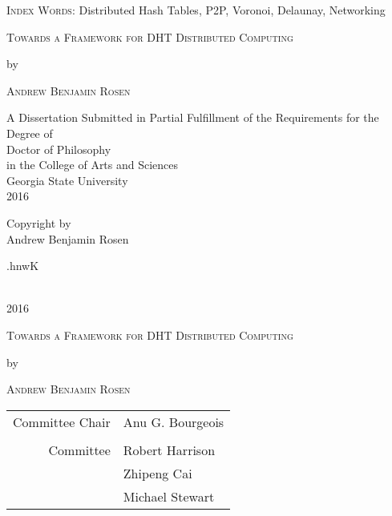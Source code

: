 \documentclass[11pt,letterpaper]{report}
\begin{document}
		\vfill
		

		{\textsc{Index Words}: Distributed Hash Tables, P2P, Voronoi, Delaunay, Networking}
	
	
	\newpage 
	\begin{titlepage}
		
		\begin{center}
			{\scshape Towards a Framework for DHT Distributed Computing\par}
			\vspace{5cm}
			{by\par}
			\vspace{5cm}
			{\scshape Andrew Benjamin Rosen\par}
			
			\vfill
			A Dissertation Submitted in Partial Fulfillment of the Requirements for the Degree of\\
			Doctor of Philosophy\\
			in the College of Arts and Sciences\\
			Georgia State University\\
			2016
		\end{center}
	\end{titlepage}
	
	
	
	
	
	
	\null\vfill
	\begin{center}
		
		Copyright by \\
		Andrew Benjamin Rosen\\
		\begin{cjhebrew}
			.hnwK
		\end{cjhebrew}\\
		2016
	\end{center}
	\newpage
	


	\begin{center}
		{\scshape Towards a Framework for DHT Distributed Computing\par}
		\vspace{5cm}
		{by\par}
		\vspace{5cm}
		{\scshape Andrew Benjamin Rosen\par}
	\end{center}
	\vfill
	\hfill\begin{tabular}{rl}
		Committee Chair & Anu G. Bourgeois \\ 
		&  \\ 
		Committee & Robert Harrison  \\ 
		& Zhipeng Cai
		\\ 
		& Michael Stewart 
	\end{tabular} 
	
\end{document}
